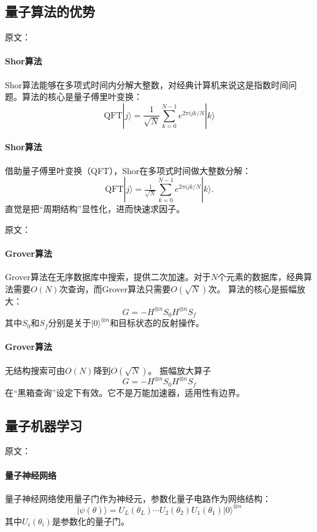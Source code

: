 \subsection{量子算法的优势}

原文：
\paragraph{Shor算法}
Shor算法能够在多项式时间内分解大整数，对经典计算机来说这是指数时间问题。算法的核心是量子傅里叶变换：
$$\text{QFT}|j\rangle = \frac{1}{\sqrt{N}} \sum_{k=0}^{N-1} e^{2\pi ijk/N} |k\rangle$$
\paragraph{Shor算法}
借助量子傅里叶变换（QFT），Shor在多项式时间做大整数分解：
$$\mathrm{QFT}|j\rangle=\tfrac{1}{\sqrt{N}}\sum_{k=0}^{N-1}e^{2\pi ijk/N}|k\rangle.$$
直觉是把“周期结构”显性化，进而快速求因子。

原文：
\paragraph{Grover算法}
Grover算法在无序数据库中搜索，提供二次加速。对于$N$个元素的数据库，经典算法需要$O(N)$次查询，而Grover算法只需要$O(\sqrt{N})$次。
算法的核心是振幅放大：
$$G = -H^{\otimes n} S_0 H^{\otimes n} S_f$$
其中$S_0$和$S_f$分别是关于$|0\rangle^{\otimes n}$和目标状态的反射操作。
\paragraph{Grover算法}
无结构搜索可由$O(N)$降到$O(\sqrt{N})$。  
振幅放大算子
$$G=-H^{\otimes n}S_0H^{\otimes n}S_f$$
在“黑箱查询”设定下有效。\;它不是万能加速器，适用性有边界。

\subsection{量子机器学习}

原文：
\paragraph{量子神经网络}
量子神经网络使用量子门作为神经元，参数化量子电路作为网络结构：
$$|\psi(\theta)\rangle = U_L(\theta_L) \cdots U_2(\theta_2) U_1(\theta_1) |0\rangle^{\otimes n}$$
其中$U_i(\theta_i)$是参数化的量子门。
